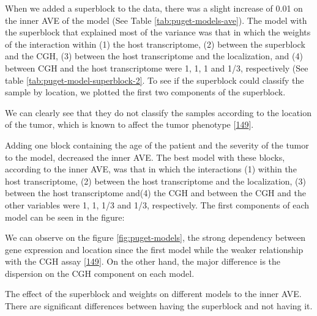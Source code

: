 \documentclass[
  12pt,
  a4paper,
  twoside,
  openright]{book}
\begin{document}
When we added a superblock to the data, there was a slight increase of 0.01 on the inner AVE of the model (See Table \ref{tab:puget-models-ave}).
The model with the superblock that explained most of the variance was that in which the weights of the interaction within (1) the host transcriptome, (2) between the superblock and the CGH, (3) between the host transcriptome and the localization, and (4) between CGH and the host transcriptome were 1, 1, 1 and 1/3, respectively (See table \ref{tab:puget-model-superblock-2}.
To see if the superblock could classify the sample by location, we plotted the first two components of the superblock.

We can clearly see that they do not classify the samples according to the location of the tumor, which is known to affect the tumor phenotype {[}\protect\hyperlink{ref-puget2012}{149}{]}.

Adding one block containing the age of the patient and the severity of the tumor to the model, decreased the inner AVE.
The best model with these blocks, according to the inner AVE, was that in which the interactions (1) within the host transcriptome, (2) between the host transcriptome and the localization, (3) between the host transcriptome and(4) the CGH and between the CGH and the other variables were 1, 1, 1/3 and 1/3, respectively.
The first components of each model can be seen in the figure:

We can observe on the figure \ref{fig:puget-models}, the strong dependency between gene expression and location since the first model while the weaker relationship with the CGH assay {[}\protect\hyperlink{ref-puget2012}{149}{]}.
On the other hand, the major difference is the dispersion on the CGH component on each model.

The effect of the superblock and weights on different models to the inner AVE.
There are significant differences between having the superblock and not having it.
\end{document}
